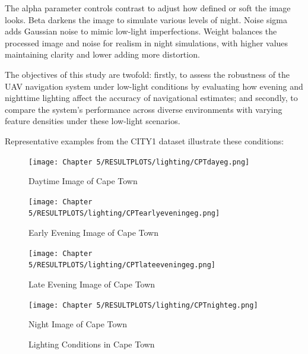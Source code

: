         

The alpha parameter controls contrast to adjust how defined or soft the image looks. Beta darkens the image to simulate various levels of night. Noise sigma adds Gaussian noise to mimic low-light imperfections. Weight balances the processed image and noise for realism in night simulations, with higher values maintaining clarity and lower adding more distortion.

The objectives of this study are twofold: firstly, to assess the robustness of the UAV navigation system under low-light conditions by evaluating how evening and nighttime lighting affect the accuracy of navigational estimates; and secondly, to compare the system's performance across diverse environments with varying feature densities under these low-light scenarios.

Representative examples from the CITY1 dataset illustrate these conditions:
\begin{figure}[H]
    \centering
    \begin{minipage}{0.24\textwidth} %
        \centering
        \texttt{[image: Chapter 5/RESULTPLOTS/lighting/CPTdayeg.png]}
        \caption{Daytime Image of Cape Town}
        \label{fig:Day_CPT}
    \end{minipage}\hfill
    \begin{minipage}{0.24\textwidth} %
        \centering
        \texttt{[image: Chapter 5/RESULTPLOTS/lighting/CPTearlyeveningeg.png]}
        \caption{Early Evening Image of Cape Town}
        \label{fig:Early_Evening_CPT}
    \end{minipage}\hfill
    \begin{minipage}{0.24\textwidth} %
        \centering
        \texttt{[image: Chapter 5/RESULTPLOTS/lighting/CPTlateeveningeg.png]}
        \caption{Late Evening Image of Cape Town}
        \label{fig:Late_Evening_CPT}
    \end{minipage}\hfill
    \begin{minipage}{0.24\textwidth} %
        \centering
        \texttt{[image: Chapter 5/RESULTPLOTS/lighting/CPTnighteg.png]}
        \caption{Night Image of Cape Town}
        \label{fig:Night_CPT}
    \end{minipage}
    
    \caption{Lighting Conditions in Cape Town}
    \label{fig:Lighting_CPT}
\end{figure}


